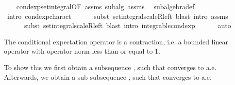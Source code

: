 \begin{isabellebody}
%
\isadelimproof
\ \ %
\endisadelimproof
%
\isatagproof
{}\isamarkupfalse%
\ cond{\isacharunderscore}{\kern0pt}exp{\isacharunderscore}{\kern0pt}set{\isacharunderscore}{\kern0pt}integral{\isacharbrackleft}{\kern0pt}OF\ assms{\isacharbrackright}{\kern0pt}\ subalg\ assms\ \isamarkupfalse%
\ subalgebra{\isacharunderscore}{\kern0pt}def\isanewline
\ \ \isamarkupfalse%
\ {\isacharparenleft}{\kern0pt}intro\ cond{\isacharunderscore}{\kern0pt}exp{\isacharunderscore}{\kern0pt}charact{\isacharcomma}{\kern0pt}\isanewline
\ \ \ \ \ \ subst\ set{\isacharunderscore}{\kern0pt}integral{\isacharunderscore}{\kern0pt}scaleR{\isacharunderscore}{\kern0pt}left{\isacharcomma}{\kern0pt}\ blast{\isacharcomma}{\kern0pt}\ intro\ assms{\isacharcomma}{\kern0pt}\ \isanewline
\ \ \ \ \ \ subst\ set{\isacharunderscore}{\kern0pt}integral{\isacharunderscore}{\kern0pt}scaleR{\isacharunderscore}{\kern0pt}left{\isacharcomma}{\kern0pt}\ blast{\isacharcomma}{\kern0pt}\ intro\ integrable{\isacharunderscore}{\kern0pt}cond{\isacharunderscore}{\kern0pt}exp{\isacharparenright}{\kern0pt}\isanewline
\ \ \ \ \ \ auto%
\endisatagproof
{\isafoldproof}%
%
\isadelimproof
%
\endisadelimproof
%
\begin{isamarkuptext}%
The conditional expectation operator is a contraction, i.e. a bounded linear operator with operator norm less than or equal to 1.%
\end{isamarkuptext}\isamarkuptrue%
%
\begin{isamarkuptext}%
To show this we first obtain a subsequence , such that  converges to  a.e. 
      Afterwards, we obtain a sub-subsequence , such that   converges to  a.e.

\end{isamarkuptext}
\end{isabellebody}
